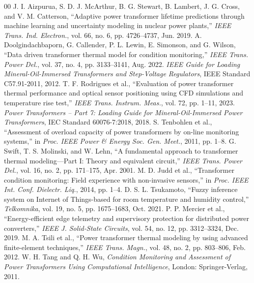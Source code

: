 \documentclass[conference]{IEEEtran}
\begin{document}
\begin{thebibliography}{00}
 J. I. Aizpurua, S. D. J. McArthur, B. G. Stewart, B. Lambert, J. G. Cross, and V. M. Catterson, ``Adaptive power transformer lifetime predictions through machine learning and uncertainty modeling in nuclear power plants,'' \textit{IEEE Trans. Ind. Electron.}, vol. 66, no. 6, pp. 4726--4737, Jun. 2019.
 A. Doolgindachbaporn, G. Callender, P. L. Lewin, E. Simonson, and G. Wilson, ``Data driven transformer thermal model for condition monitoring,'' \textit{IEEE Trans. Power Del.}, vol. 37, no. 4, pp. 3133--3141, Aug. 2022.
 \textit{IEEE Guide for Loading Mineral-Oil-Immersed Transformers and Step-Voltage Regulators}, IEEE Standard C57.91-2011, 2012.
 T. F. Rodrigues et al., ``Evaluation of power transformer thermal performance and optical sensor positioning using CFD simulations and temperature rise test,'' \textit{IEEE Trans. Instrum. Meas.}, vol. 72, pp. 1--11, 2023.
 \textit{Power Transformers -- Part 7: Loading Guide for Mineral-Oil-Immersed Power Transformers}, IEC Standard 60076-7:2018, 2018.
 S. Tenbohlen et al., ``Assessment of overload capacity of power transformers by on-line monitoring systems,'' in \textit{Proc. IEEE Power \& Energy Soc. Gen. Meet.}, 2011, pp. 1--8.
 G. Swift, T. S. Molinski, and W. Lehn, ``A fundamental approach to transformer thermal modeling---Part I: Theory and equivalent circuit,'' \textit{IEEE Trans. Power Del.}, vol. 16, no. 2, pp. 171--175, Apr. 2001.
 M. D. Judd et al., ``Transformer condition monitoring: Field experience with non-invasive sensors,'' in \textit{Proc. IEEE Int. Conf. Dielectr. Liq.}, 2014, pp. 1--4.
 D. S. L. Tsukamoto, ``Fuzzy inference system on Internet of Things-based for room temperature and humidity control,'' \textit{Telkomnika}, vol. 19, no. 5, pp. 1675--1683, Oct. 2021.
 P. P. Mercier et al., ``Energy-efficient edge telemetry and supervisory protection for distributed power converters,'' \textit{IEEE J. Solid-State Circuits}, vol. 54, no. 12, pp. 3312--3324, Dec. 2019.
 M. A. Tsili et al., ``Power transformer thermal modeling by using advanced finite-element techniques,'' \textit{IEEE Trans. Magn.}, vol. 48, no. 2, pp. 803--806, Feb. 2012.
 W. H. Tang and Q. H. Wu, \textit{Condition Monitoring and Assessment of Power Transformers Using Computational Intelligence}, London: Springer-Verlag, 2011.
\end{thebibliography}
\end{document}
